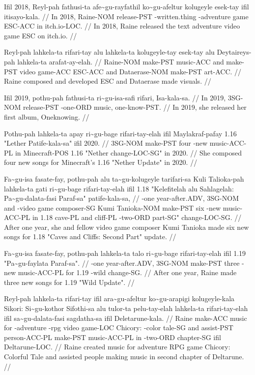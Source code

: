 \ex
\begingl
\gla Ifil 2018, Reyl-pah fathusi-ta  afe\~{}gu-rayfathil ko\~{}gu-afeltur kolugeyle esek-tay ifil itisayo-kala. //
\glb In 2018, Raine-NOM release-PST  \agradj-written.thing \agradj-adventure game ESC-ACC in itch.io-LOC. //
\glft In 2018, Raine released the text adventure video game ESC on itch.io. //
\endgl
\xe

\ex
\begingl
\gla Reyl-pah lahkela-ta rifari-tay alu lahkela-ta kolugeyle-tay esek-tay alu Deytaireys-pah lahkela-ta arafat-ay-elah. //
\glb Raine-NOM make-PST music-ACC and make-PST video game-ACC ESC-ACC and Dataerase-NOM make-PST art-ACC. //
\glft Raine composed and developed ESC and Dataerase made visuals. //
\endgl
\xe

\ex
\begingl
\gla Ifil 2019, pothu-pah fathusi-ta  ri\~{}gu-isa-safi rifari, Isa-kala-sa. //
\glb In 2019, 3SG-NOM release-PST  \agradj-one-ORD music, one-know-PST. //
\glft In 2019, she released her first album, Oneknowing. //
\endgl
\xe

\ex
\begingl
\gla Pothu-pah lahkela-ta apay ri\~{}gu-bage rifari-tay-elah ifil Maylakraf-pafay 1.16 "Lether Patife-kala-sa" ifil 2020. //
\glb 3SG-NOM make-PST four \agradj-new music-ACC-PL in Minecraft-POS 1.16 "Nether change-LOC-SG" in 2020. //
\glft She composed four new songs for Minecraft's 1.16 "Nether Update" in 2020. //
\endgl
\xe

\ex
\begingl
\gla Fa\~{}gu-isa fasate-fay, pothu-pah alu  ta\~{}gu-kolugeyle tarifari-sa Kuli Talioka-pah lahkela-ta gati ri\~{}gu-bage rifari-tay-elah ifil 1.18 "Kelefitelah alu Sahlagelah: Pa\~{}gu-dalata-fasi Paraf-sa" patife-kala-sa, //
\glb \agradj-one year-after.ADV, 3SG-NOM and  \agradj-video game composer-SG Kumi Tanioka-NOM make-PST six \agradj-new music-ACC-PL in 1.18 cave-PL and cliff-PL \agradj-two-ORD part-SG" change-LOC-SG. //
\glft After one year, she and fellow video game composer Kumi Tanioka  made six new songs for 1.18 "Caves and Cliffs: Second Part" update. //
\endgl
\xe

\ex
\begingl
\gla Fa\~{}gu-isa fasate-fay, pothu-pah lahkela-ta talo ri\~{}gu-bage rifari-tay-elah ifil 1.19 "Pa\~{}gu-faylata Paraf-sa". //
\glb \agradj-one year-after.ADV, 3SG-NOM make-PST three \agradj-new music-ACC-PL for 1.19 \agradj-wild change-SG. //
\glft After one year, Raine made three new songs for 1.19 "Wild Update". //
\endgl
\xe

\ex
\begingl
\gla Reyl-pah lahkela-ta rifari-tay ifil ara\~{}gu-afeltur ko\~{}gu-arapigi kolugeyle-kala Sikori: Si\~{}gu-kothor Sifothi-sa alu tulor-ta pelu-tay-elah lahkela-ta rifari-tay-elah ifil sa\~{}gu-dalata-fasi sagdatha-sa ifil Deletarune-kala. //
\glb Raine make-ACC music for \agradj-adventure \agradj-rpg video game-LOC Chicory: \agradj-color tale-SG and assist-PST person-ACC-PL make-PST music-ACC-PL in \agradj-two-ORD chapter-SG ifil Deltarune-LOC. //
\glft Raine created music for adventure RPG game Chicory: Colorful Tale and assisted people making music in second chapter of Deltarune. //
\endgl
\xe

